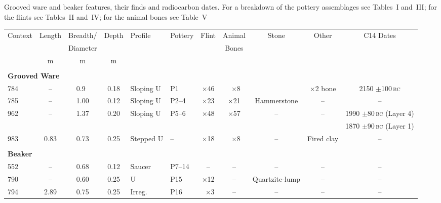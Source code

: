 \begin{table}
  \processtable
  {Grooved ware and beaker features, their finds and
    radiocarbon dates. For a breakdown of the pottery assemblages see
    Tables~I and~III; for the flints see Tables~II and~IV; for the animal
    bones see Table~V\label{sideways}}
  {\addtolength\tabcolsep{-2pt}
    \begin{tabular}{lcccllccccc}
    Context & Length & Breadth/  & Depth & Profile & Pottery & Flint & Animal
                                                     & Stone & Other & C14 Dates\\
    && Diameter &&&&& Bones\\[6pt]
    & m & m & m\\
    \hline\\[-5pt]
    \multicolumn{10}{l}{\textbf{Grooved Ware}}\\
    784 & --   & 0.9$\phantom{0}$ &0.18  & Sloping U & P1      & $\times$46
          & $\phantom{0}$$\times$8 && $\times$2 bone & 2150 $\pm$100\,\textsc{bc}\\
    785 & --   & 1.00             &0.12   & Sloping U & P2--4  & $\times$23
                                             & $\times$21 & Hammerstone & -- & --\\
    962 & --   & 1.37             &0.20   & Sloping U & P5--6  & $\times$48
                       & $\times$57 & --& --& 1990 $\pm$80\,\textsc{bc} (Layer 4)\\
    &&&&&&&&&& 1870 $\pm$90\,\textsc{bc} (Layer 1)\\
    983 & 0.83 & 0.73             &0.25   & Stepped U & --     & $\times$18
                                  & $\phantom{0}$$\times$8 & -- & Fired clay & --\\
    &&&&&&&&&&\\
    \multicolumn{10}{l}{\textbf{Beaker}}\\
    552 & --   & 0.68             & 0.12  & Saucer    & P7--14 & --           & --
                                                                     & -- &-- &--\\
    790 & --   & 0.60             & 0.25  & U         & P15    & $\times$12   & --
                                                        & Quartzite-lump & -- &--\\
    794 & 2.89 & 0.75             & 0.25  & Irreg.    & P16    & $\phantom{0}$$\times$3
                                                                & -- & -- &-- &--\\
    \end{tabular}}
\end{table}

